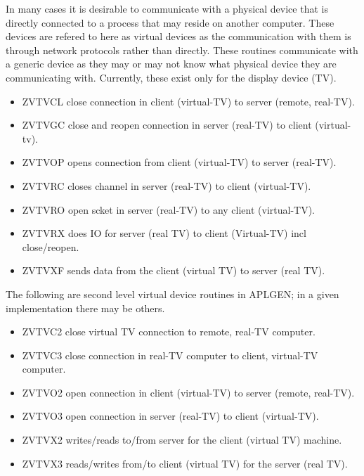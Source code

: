 In many cases it is desirable to communicate with a physical device
that is directly connected to a process that may reside on another
computer. These devices are refered to here as virtual devices as the
communication with them is through network protocols rather than
directly.  These routines communicate with a generic device as they
may or may not know what physical device they are communicating with.
Currently, these exist only for the display device (TV).
\begin{itemize} %
\item ZVTVCL  close connection in client (virtual-TV) to
server (remote, real-TV).
\item ZVTVGC  close and reopen connection in server
(real-TV) to client (virtual-tv).
\item ZVTVOP  opens connection from client (virtual-TV)
to server (real-TV).
\item ZVTVRC  closes channel in server (real-TV) to
client (virtual-TV).
\item ZVTVRO  open scket in server (real-TV) to any
client (virtual-TV).
\item ZVTVRX  does IO for server (real TV) to client
(Virtual-TV) incl close/reopen.
\item ZVTVXF  sends data from the client (virtual TV) to
server (real TV).
\end{itemize} %

The following are second level virtual device routines in APLGEN; in a given
implementation there may be others.
\begin{itemize} %
\item ZVTVC2  close virtual TV connection to remote,
real-TV computer.
\item ZVTVC3  close connection in real-TV computer to
client, virtual-TV computer.
\item ZVTVO2  open connection in client (virtual-TV) to
server (remote, real-TV).
\item ZVTVO3  open connection in server (real-TV) to
client (virtual-TV).
\item ZVTVX2  writes/reads to/from server for the client
(virtual TV) machine.
\item ZVTVX3  reads/writes from/to client (virtual TV)
for the server (real TV).
\end{itemize} %

